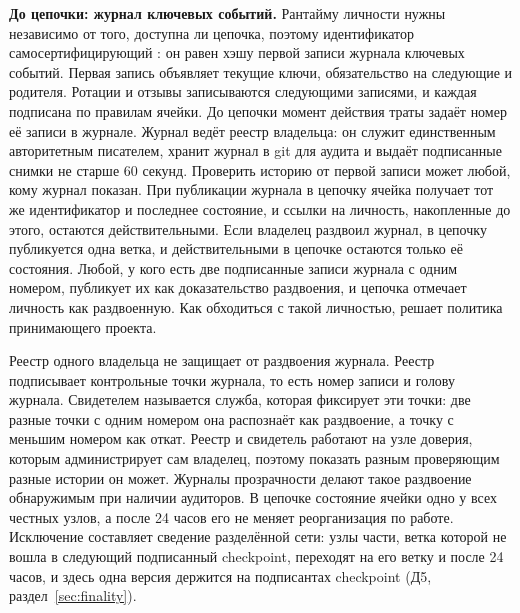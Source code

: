 \documentclass[10pt,a4paper]{article}
\begin{document}
\textbf{До цепочки: журнал ключевых событий.}
Рантайму личности нужны независимо от того, доступна ли цепочка, поэтому идентификатор самосертифицирующий \cite{keri}: он равен хэшу первой записи журнала ключевых событий.
Первая запись объявляет текущие ключи, обязательство на следующие и родителя.
Ротации и отзывы записываются следующими записями, и каждая подписана по правилам ячейки.
До цепочки момент действия траты задаёт номер её записи в журнале.
Журнал ведёт реестр владельца: он служит единственным авторитетным писателем, хранит журнал в git для аудита и выдаёт подписанные снимки не старше 60 секунд.
Проверить историю от первой записи может любой, кому журнал показан.
При публикации журнала в цепочку ячейка получает тот же идентификатор и последнее состояние, и ссылки на личность, накопленные до этого, остаются действительными.
Если владелец раздвоил журнал, в цепочку публикуется одна ветка, и действительными в цепочке остаются только её состояния.
Любой, у кого есть две подписанные записи журнала с одним номером, публикует их как доказательство раздвоения, и цепочка отмечает личность как раздвоенную.
Как обходиться с такой личностью, решает политика принимающего проекта.

Реестр одного владельца не защищает от раздвоения журнала.
Реестр подписывает контрольные точки журнала, то есть номер записи и голову журнала.
Свидетелем называется служба, которая фиксирует эти точки: две разные точки с одним номером она распознаёт как раздвоение, а точку с меньшим номером как откат.
Реестр и свидетель работают на узле доверия, которым администрирует сам владелец, поэтому показать разным проверяющим разные истории он может.
Журналы прозрачности \cite{ct2,coniks,sigstore} делают такое раздвоение обнаружимым при наличии аудиторов.
В цепочке состояние ячейки одно у всех честных узлов, а после 24 часов его не меняет реорганизация по работе. Исключение составляет сведение разделённой сети: узлы части, ветка которой не вошла в следующий подписанный checkpoint, переходят на его ветку и после 24 часов, и здесь одна версия держится на подписантах checkpoint (Д5, раздел~\ref{sec:finality}).
\end{document}
